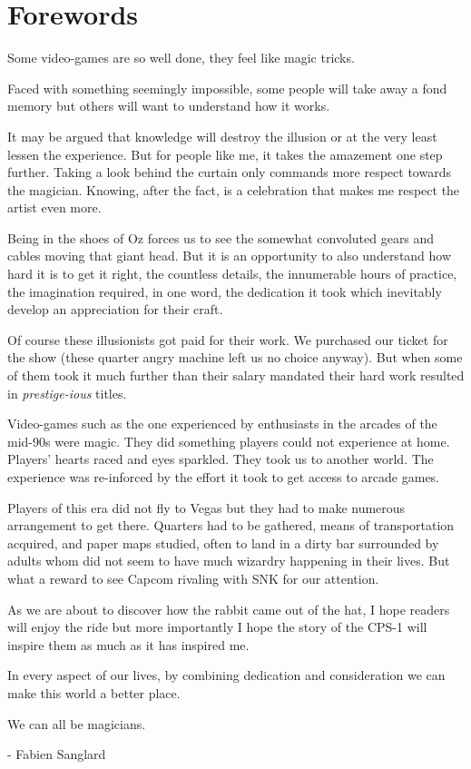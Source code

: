 \chapter*{Forewords}

Some video-games are so well done, they feel like magic tricks.

Faced with something seemingly impossible, some people will take away a fond memory but others will want to understand
how it works.

It may be argued that knowledge will destroy the illusion or at the very least lessen the experience. But for people like me, it takes the amazement one step further. Taking a look behind the curtain only commands more respect towards the magician. Knowing, after the fact, is a celebration that makes me respect the artist even more.

Being in the shoes of Oz forces us to see the somewhat convoluted gears and cables moving that giant head. But it is an opportunity to also understand how hard it is to get it right, the countless details, the innumerable hours of practice, the imagination required, in one word, the dedication it took which inevitably develop an appreciation for their craft.


Of course these illusionists got paid for their work. We purchased our ticket for the show (these quarter angry machine left us no choice anyway). But when some of them took it much further than their salary mandated their hard work resulted in \emph{prestige-ious} titles.

Video-games such as the one experienced by enthusiasts in the arcades of the mid-90s were magic. They did something players could not experience at home. Players' hearts raced and eyes sparkled. They took us to another world. The experience was re-inforced by the effort it took to get access to arcade games. 

Players of this era did not fly to Vegas but they had to make numerous arrangement to get there. Quarters had to be gathered,  means of transportation acquired, and paper maps studied, often to land in a dirty bar surrounded by adults whom did not seem to have much wizardry happening in their lives. But what a reward to see Capcom rivaling with SNK for our attention. 

As we are about to discover how the rabbit came out of the hat, I hope readers will enjoy the ride but more importantly I hope the story of the CPS-1 will inspire them as much as it has inspired me.

In every aspect of our lives, by combining dedication and consideration we can make this world a better place. 

We can all be magicians.

- Fabien Sanglard